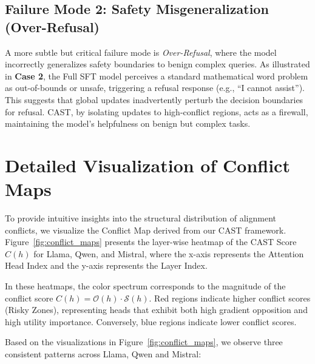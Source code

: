 \documentclass[11pt]{article}
\begin{document}
\subsection{Failure Mode 2: Safety Misgeneralization (Over-Refusal)}
A more subtle but critical failure mode is \textit{Over-Refusal}, where the model incorrectly generalizes safety boundaries to benign complex queries. As illustrated in \textbf{Case 2}, the Full SFT model perceives a standard mathematical word problem as out-of-bounds or unsafe, triggering a refusal response (e.g., ``I cannot assist''). This suggests that global updates inadvertently perturb the decision boundaries for refusal. CAST, by isolating updates to high-conflict regions, acts as a firewall, maintaining the model's helpfulness on benign but complex tasks.



\section{Detailed Visualization of Conflict Maps}
\label{app:heatmap}

To provide intuitive insights into the structural distribution of alignment conflicts, we visualize the Conflict Map derived from our CAST framework. Figure~\ref{fig:conflict_maps} presents the layer-wise heatmap of the CAST Score $C(h)$ for Llama, Qwen, and Mistral, where the x-axis represents the Attention Head Index and the y-axis represents the Layer Index.

In these heatmaps, the color spectrum corresponds to the magnitude of the conflict score $C(h) = \mathcal{O}(h) \cdot \mathcal{S}(h)$. Red regions indicate higher conflict scores (Risky Zones), representing heads that exhibit both high gradient opposition and high utility importance. Conversely, blue regions indicate lower conflict scores.

Based on the visualizations in Figure~\ref{fig:conflict_maps}, we observe three consistent patterns across Llama, Qwen and Mistral:
\end{document}

